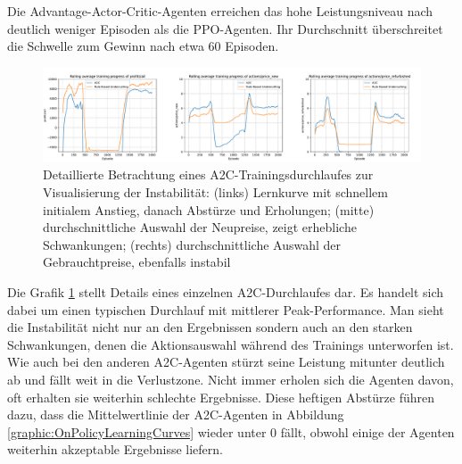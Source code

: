 Die Advantage-Actor-Critic-Agenten erreichen das hohe Leistungsniveau nach deutlich weniger Episoden als die PPO-Agenten.
Ihr Durchschnitt überschreitet die Schwelle zum Gewinn nach etwa 60 Episoden.
\begin{figure}[htb]
	\centering
	\includegraphics[width=\textwidth]{main/a2c_detailed_analysis.pdf}
	\caption{
		Detaillierte Betrachtung eines A2C-Trainingsdurchlaufes zur Visualisierung der Instabilität:
		(links) Lernkurve mit schnellem initialem Anstieg, danach Abstürze und Erholungen;
		(mitte) durchschnittliche Auswahl der Neupreise, zeigt erhebliche Schwankungen;
		(rechts) durchschnittliche Auswahl der Gebrauchtpreise, ebenfalls instabil
	}
	\label{graphic:A2CInstability}
\end{figure}
Die Grafik \ref{graphic:A2CInstability} stellt Details eines einzelnen A2C-Durchlaufes dar.
Es handelt sich dabei um einen typischen Durchlauf mit mittlerer Peak-Performance.
Man sieht die Instabilität nicht nur an den Ergebnissen sondern auch an den starken Schwankungen, denen die Aktionsauswahl während des Trainings unterworfen ist.
Wie auch bei den anderen A2C-Agenten stürzt seine Leistung mitunter deutlich ab und fällt weit in die Verlustzone.
Nicht immer erholen sich die Agenten davon, oft erhalten sie weiterhin schlechte Ergebnisse.
Diese heftigen Abstürze führen dazu, dass die Mittelwertlinie der A2C-Agenten in Abbildung \ref{graphic:OnPolicyLearningCurves} wieder unter 0 fällt, obwohl einige der Agenten weiterhin akzeptable Ergebnisse liefern.

